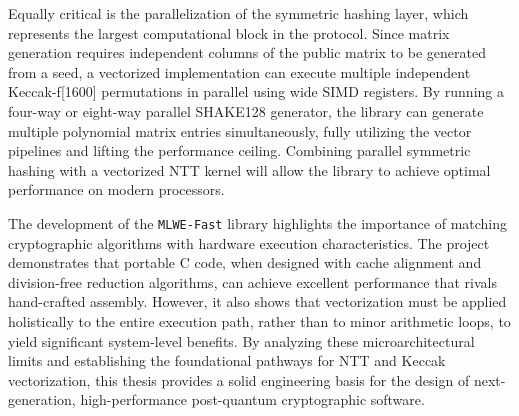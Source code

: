 Equally critical is the parallelization of the symmetric hashing layer, which represents the largest computational block in the protocol. Since matrix generation requires independent columns of the public matrix to be generated from a seed, a vectorized implementation can execute multiple independent Keccak-f[1600] permutations in parallel using wide SIMD registers. By running a four-way or eight-way parallel SHAKE128 generator, the library can generate multiple polynomial matrix entries simultaneously, fully utilizing the vector pipelines and lifting the performance ceiling. Combining parallel symmetric hashing with a vectorized NTT kernel will allow the library to achieve optimal performance on modern processors.

The development of the \texttt{MLWE-Fast} library highlights the importance of matching cryptographic algorithms with hardware execution characteristics. The project demonstrates that portable C code, when designed with cache alignment and division-free reduction algorithms, can achieve excellent performance that rivals hand-crafted assembly. However, it also shows that vectorization must be applied holistically to the entire execution path, rather than to minor arithmetic loops, to yield significant system-level benefits. By analyzing these microarchitectural limits and establishing the foundational pathways for NTT and Keccak vectorization, this thesis provides a solid engineering basis for the design of next-generation, high-performance post-quantum cryptographic software.